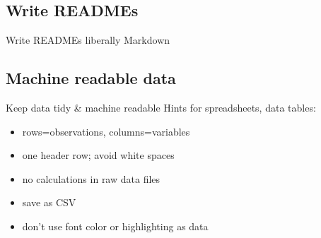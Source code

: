 \documentclass[10pt,aspectratio=169,notes]{beamer} %
\begin{document}
\subsection{Write READMEs}
\begin{frame}{Write READMEs liberally}
Markdown	
\end{frame}
\note{}
\subsection{Machine readable data}
\begin{frame}{Keep data tidy \& machine readable}
Hints for spreadsheets, data tables:
\begin{itemize}
	\item rows=observations, columns=variables
	\item one header row; avoid white spaces
	\item no calculations in raw data files
	\item save as CSV
	\item don't use font color or highlighting as data
\end{itemize}	
\end{frame}
\note{}
\end{document}

